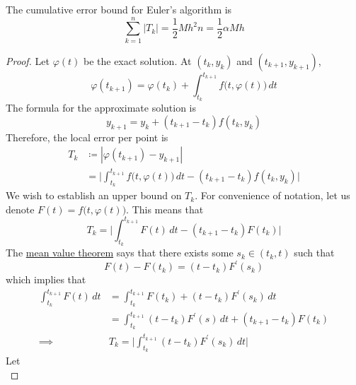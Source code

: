 \documentclass{article}
\newcounter{theorem}[section]
\begin{document}
    \begin{theorem}
      \label{thm:error-bound-for-eulers-algorithm}
    The cumulative error bound for Euler's algorithm is
    \begin{equation}
      \sum_{k=1}^n |T_k| = \frac{1}{2} M h^2 n = \frac{1}{2} \alpha M h
    \end{equation}
    \end{theorem}
    \begin{proof}
    Let $\varphi(t)$ be the exact solution. At $(t_k, y_k)$ and $(t_{k+1}, y_{k+1})$, 
    \begin{equation}
      \varphi(t_{k+1}) = \varphi(t_k) + \int_{t_k}^{t_{k+1}} f\big(t, \varphi(t)\big) \, dt
    \end{equation}
    The formula for the approximate solution is
    \begin{equation}
      y_{k+1} = y_k + (t_{k+1} - t_k) f(t_k, y_k)
    \end{equation}
    Therefore, the local error per point is 
    \begin{align*}
        T_k & \coloneqq |\varphi(t_{k+1}) - y_{k+1}| \\
        & = \bigg| \int_{t_k}^{t_{k+1}} f\big(t, \varphi(t)\big)\, dt - (t_{k+1} - t_k) f(t_k, y_k) \bigg| 
    \end{align*}
    We wish to establish an upper bound on $T_k$. For convenience of notation, let us denote $F(t) = f\big(t, \varphi(t)\big)$. This means that 
    \begin{equation}
      T_k = \bigg| \int_{t_k}^{t_{k+1}} F(t)\,dt - (t_{k+1} - t_k ) F(t_k) \bigg|
    \end{equation}
    The \hyperref[mv-thm:mean-value-theorem]{mean value theorem} says that there exists some $s_k \in (t_k, t)$ such that 
    \begin{equation}
      F(t) - F(t_k) = (t - t_k) F^\prime (s_k)
    \end{equation}
    which implies that
    \begin{align*}
        \int_{t_k}^{t_{k+1}} F(t)\, dt & = \int_{t_k}^{t_{k+1}} F(t_k) + (t - t_k) F^\prime (s_k)\,dt \\
        & = \int_{t_k}^{t_{k+1}} (t - t_k) F^\prime (s) \, dt + (t_{k+1} - t_k) F (t_k) \\
        \implies & T_k = \bigg| \int_{t_k}^{t_{k+1}}  (t - t_k) F^\prime (s_k)\, dt \bigg|
    \end{align*}
    Let 
    \begin{equation}

\end{equation}
\end{proof}
\end{document}

